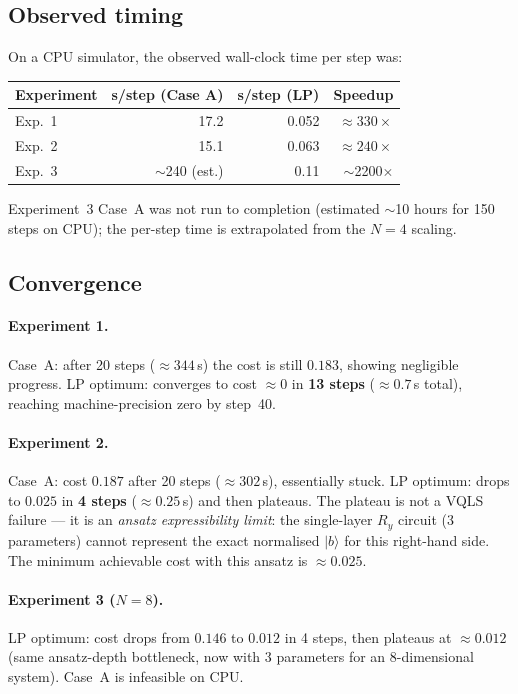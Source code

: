 \documentclass{article}
\begin{document}
\subsection*{Observed timing}

On a CPU simulator, the observed wall-clock time per step was:

\begin{center}
\begin{tabular}{lrrr}
\toprule
Experiment & s/step (Case A) & s/step (LP) & Speedup \\
\midrule
Exp.~1 & 17.2 & 0.052 & $\approx330\times$ \\
Exp.~2 & 15.1 & 0.063 & $\approx240\times$ \\
Exp.~3 & $\sim$240 (est.) & 0.11 & $\sim$2200$\times$ \\
\bottomrule
\end{tabular}
\end{center}

Experiment~3 Case~A was not run to completion (estimated $\sim$10 hours for 150
steps on CPU); the per-step time is extrapolated from the $N=4$ scaling.

\subsection*{Convergence}

\paragraph{Experiment 1.}
Case~A: after 20 steps ($\approx344$\,s) the cost is still $0.183$, showing
negligible progress.  LP optimum: converges to cost $\approx 0$ in
\textbf{13 steps} ($\approx0.7$\,s total), reaching machine-precision zero by
step~40.

\paragraph{Experiment 2.}
Case~A: cost $0.187$ after 20 steps ($\approx302$\,s), essentially stuck.
LP optimum: drops to $0.025$ in \textbf{4 steps} ($\approx0.25$\,s) and then
plateaus.  The plateau is not a VQLS failure --- it is an \emph{ansatz
expressibility limit}: the single-layer $R_y$ circuit (3 parameters) cannot
represent the exact normalised $|b\rangle$ for this right-hand side.  The
minimum achievable cost with this ansatz is $\approx 0.025$.

\paragraph{Experiment 3 ($N=8$).}
LP optimum: cost drops from $0.146$ to $0.012$ in 4 steps, then plateaus at
$\approx 0.012$ (same ansatz-depth bottleneck, now with 3 parameters for an
8-dimensional system).  Case~A is infeasible on CPU.
\end{document}
